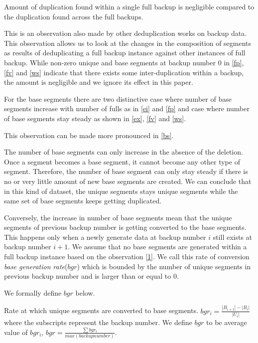 \begin{observation}\label{1}
Amount of duplication found within a single full backup is negligible compared to the duplication found across the full backups.
\end{observation}

This is an observation also made by other deduplication works on backup data\cite{kruus-bimodal}. This observation allows us to look at the changes in the composition of segments as results of deduplicating a full backup instance against other instances of full backup. While non-zero unique and base segments at backup number 0 in \figurename \ref{fp},  \figurename \ref{fv} and  \figurename \ref{ws} indicate that there exists some inter-duplication within a backup, the amount is negligible and we ignore its effect in this paper.

\begin{observation}\label{2}
For the base segments there are two distinctive case where number of base segments increase with number of fulls as in \figurename \ref{ei} and \figurename \ref{fp} and case where number of base segments stay steady as shown in \figurename \ref{ex}, \figurename \ref{fv} and \figurename \ref{ws}.
\end{observation}

This observation can be made more pronounced in \figurename \ref{bs}.

The number of base segments can only increase in the absence of the deletion. Once a segment becomes a base segment, it cannot become any other type of segment. Therefore, the number of base segment can only stay steady if there is no or very little amount of new base segments are created. We can conclude that in this kind of dataset, the unique segments stays unique segments while the same set of base segments keeps getting duplicated.

Conversely, the increase in number of base segments mean that the unique segments of previous backup number is getting converted to the base segments. This happens only when a newly generate data at backup number $i$ still exists at backup number $i+1$. We assume that no base segments are generated within a full backup instance based on the observation \ref{1}. We call this rate of conversion \emph{base generation rate}($bgr$) which is bounded by the number of unique segments in previous backup number and is larger than or equal to 0.

We formally define $bgr$ below.

\begin{definition}[$bgr$]
Rate at which unique segments are converted to base segments. $bgr_i=\frac{|B_{i+1}|-|B_i|}{|U_i|}$ where the subscripts represent the backup number. We define $bgr$ to be average value of $bgr_i$, $bgr = \frac{\sum bgr_i}{max(backup number)}$.
\end{definition}

